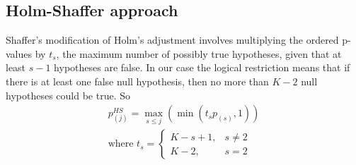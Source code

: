 \documentclass[reqno]{amsart}
\begin{document}
\subsection{Holm-Shaffer approach}
Shaffer's modification of Holm's adjustment involves multiplying the ordered p-values by $t_s$, the maximum number of possibly true hypotheses, given that at least $s - 1$ hypotheses are false. In our case the logical restriction means that if there is at least one false null hypothesis, then no more than $K-2$ null hypotheses could be true. So
\begin{gather*}
p^{HS}_{(j)} = \max_{s\leq j}(\min( t_s p_{(s)}, 1))\\
\text{where } t_s = \begin{cases}
                   K-s+1, & s\neq 2\\
                   K - 2, & s=2
                  \end{cases}
\end{gather*}
\end{document}
